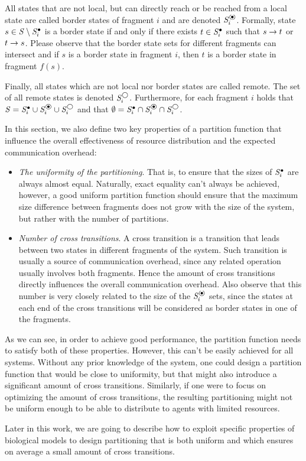 All states that are not local, but can directly reach or be reached from a local state are called border states of fragment $i$ and are denoted $\dtsSborder_i$. Formally, state $s \in \mathit{S} \setminus \mathit{S}^\bullet_i$ is a border state if and only if there exists $t \in \mathit{S}^\bullet_i$ such that $s \rightarrow t$ or $t \rightarrow s$. Please observe that the border state sets for different fragments can intersect and if $s$ is a border state in fragment $i$, then $t$ is a border state in fragment $f(s)$.

Finally, all states which are not local nor border states are called remote. The set of all remote states is denoted $\mathit{S}^\bigcirc_i$. Furthermore, for each fragment $i$ holds that $\dtsS = \dtsSlocal_i \cup \dtsSborder_i \cup \dtsSremote_i$ and that $\emptyset = \dtsSlocal_i \cap \dtsSborder_i \cap \dtsSremote_i$.

In this section, we also define two key properties of a partition function that influence the overall effectiveness of resource distribution and the expected communication overhead:

\begin{itemize}
	\item  \emph{The uniformity of the partitioning}. That is, to ensure that the sizes of $\mathit{S}^\bullet_i$ are always almost equal. Naturally, exact equality can't always be achieved, however, a good uniform partition function should ensure that the maximum size difference between fragments does not grow with the size of the system, but rather with the number of partitions.
	\item \emph{Number of cross transitions}. A cross transition is a transition that leads between two states in different fragments of the system. Such transition is usually a source of communication overhead, since any related operation usually involves both fragments. Hence the amount of cross transitions directly influences the overall communication overhead. Also observe that this number is very closely related to the size of the $\dtsSborder_i$ sets, since the states at each end of the cross transitions will be considered as border states in one of the fragments.
\end{itemize}

As we can see, in order to achieve good performance, the partition function needs to satisfy both of these properties. However, this can't be easily achieved for all systems. Without any prior knowledge of the system, one could design a partition function that would be close to uniformity, but that might also introduce a significant amount of cross transitions. Similarly, if one were to focus on optimizing the amount of cross transitions, the resulting partitioning might not be uniform enough to be able to distribute to agents with limited resources.

Later in this work, we are going to describe how to exploit specific properties of biological models to design partitioning that is both uniform and which ensures on average a small amount of cross transitions.